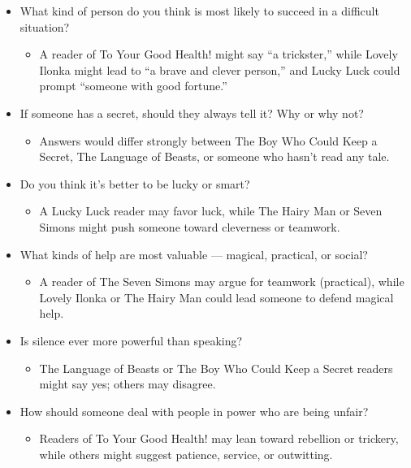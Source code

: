 \documentclass[11pt]{article}
\begin{document}
\begin{itemize}
\item What kind of person do you think is most likely to succeed in a difficult situation?
\begin{itemize}
\item A reader of To Your Good Health! might say “a trickster,” while Lovely Ilonka might lead to “a brave and clever person,” and Lucky Luck could prompt “someone with good fortune.”
\end{itemize}

\item If someone has a secret, should they always tell it? Why or why not?
\begin{itemize}
\item Answers would differ strongly between The Boy Who Could Keep a Secret, The Language of Beasts, or someone who hasn't read any tale.
\end{itemize}

\item Do you think it’s better to be lucky or smart?
\begin{itemize}
\item A Lucky Luck reader may favor luck, while The Hairy Man or Seven Simons might push someone toward cleverness or teamwork.
\end{itemize}

\item What kinds of help are most valuable — magical, practical, or social?
\begin{itemize}
\item A reader of The Seven Simons may argue for teamwork (practical), while Lovely Ilonka or The Hairy Man could lead someone to defend magical help.
\end{itemize}

\item Is silence ever more powerful than speaking?
\begin{itemize}
\item The Language of Beasts or The Boy Who Could Keep a Secret readers might say yes; others may disagree.
\end{itemize}

\item How should someone deal with people in power who are being unfair?
\begin{itemize}
\item Readers of To Your Good Health! may lean toward rebellion or trickery, while others might suggest patience, service, or outwitting.
\end{itemize}


\end{itemize}
\end{document}
